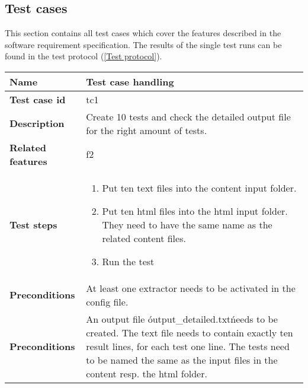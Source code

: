 \subsection{Test cases}

This section contains all test cases which cover the features described in the software requirement specification. The results of the single test runs can be found in the test protocol (\ref{Test protocol}).


	\begin{tabular}{ | p{3.5cm} | p{12cm} |}
	\hline
	\textbf{Name} 					& Test case handling 	\\ 	\hline
	\textbf{Test case id} 			& tc1 					\\ 	\hline
	\textbf{Description} 			& Create 10 tests and check the detailed output file for the right amount of tests. 	\\ 	\hline
	\textbf{Related features}		& f2		\\ 	\hline
	\textbf{Test steps} 			& 	\begin{enumerate}
											\item{Put ten text files into the content input folder.}
											\item{Put ten html files into the html input folder. They need to have the same name as the related content files.}
											\item{Run the test}
										\end{enumerate}
										\\ 	\hline
	\textbf{Preconditions} 			& At least one extractor needs to be activated in the config file.	\\ 	\hline
	\textbf{Preconditions} 			& An output file \'output\_detailed.txt\' needs to be created. The text file needs to contain exactly ten result lines, for each 											test one line. The tests need to be named the same as the input files in the content resp. the html folder.	\\ 	\hline
	\end{tabular} \\





